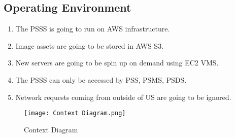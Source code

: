 \pagebreak

\subsection{Operating Environment}
\begin{enumerate}[label=OE-\arabic*]
    \item The PSSS is going to run on AWS infrastructure.
    \item Image assets are going to be stored in AWS S3.
    \item New servers are going to be spin up on demand using EC2 VMS.
    \item The PSSS can only be accessed by PSS, PSMS, PSDS.
    \item Network requests coming from outside of US are going to be ignored.
\end{enumerate}
\begin{figure}[!htb]
    \centering
    \texttt{[image: Context Diagram.png]}
    \caption{Context Diagram}
\end{figure}